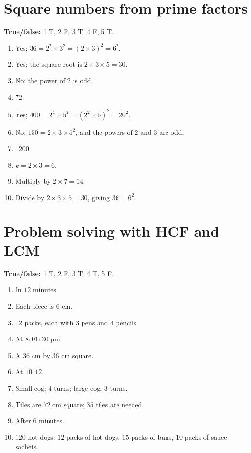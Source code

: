 \documentclass{article}
\begin{document}
\section*{Square numbers from prime factors}
\textbf{True/false:} 1 T, 2 F, 3 T, 4 F, 5 T.

\begin{enumerate}[label=\arabic*., nosep, leftmargin=*]
\item Yes; \(36=2^2\times3^2=(2\times3)^2=6^2\).
\item Yes; the square root is \(2\times3\times5=30\).
\item No; the power of \(2\) is odd.
\item \(72\).
\item Yes; \(400=2^4\times5^2=(2^2\times5)^2=20^2\).
\item No; \(150=2\times3\times5^2\), and the powers of \(2\) and \(3\) are odd.
\item \(1200\).
\item \(k=2\times3=6\).
\item Multiply by \(2\times7=14\).
\item Divide by \(2\times3\times5=30\), giving \(36=6^2\).
\end{enumerate}

\section*{Problem solving with HCF and LCM}
\textbf{True/false:} 1 T, 2 F, 3 T, 4 T, 5 F.

\begin{enumerate}[label=\arabic*., nosep, leftmargin=*]
\item In \(12\) minutes.
\item Each piece is \(6\) cm.
\item \(12\) packs, each with \(3\) pens and \(4\) pencils.
\item At \(8{:}01{:}30\) pm.
\item A \(36\) cm by \(36\) cm square.
\item At \(10{:}12\).
\item Small cog: \(4\) turns; large cog: \(3\) turns.
\item Tiles are \(72\) cm square; \(35\) tiles are needed.
\item After \(6\) minutes.
\item \(120\) hot dogs: \(12\) packs of hot dogs, \(15\) packs of buns, \(10\) packs of sauce sachets.
\end{enumerate}
\end{document}
